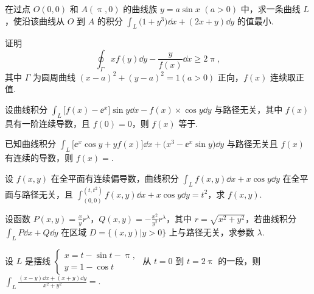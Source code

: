 	\begin{ti}
		在过点 $O(0,0)$ 和 $A(\uppi,0)$ 的曲线族 $y = a \sin x$ $(a > 0)$ 中，求一条曲线 $L$，使沿该曲线从 $O$ 到 $A$ 的积分 $\int_{L} \bigl( 1 + y^{3} \bigr) \dd{x} + (2x + y) \dd{y}$ 的值最小.
	\end{ti}

	\begin{ti}
		证明
		\[
			\oint_{\varGamma} x f(y) \dd{y} - \frac{y}{f(x)} \dd{x} \geq 2\uppi,
		\]
		其中 $\varGamma$ 为圆周曲线 $(x - a)^{2} + (y - a)^{2} = 1 (a > 0)$ 正向，$f(x)$ 连续取正值.
	\end{ti}

	\begin{ti}
		设曲线积分 $\int_{L} \bigl[ f(x) - \ee^{x} \bigr] \sin y \dd{x} - f(x)\times \cos y \dd{y}$ 与路径无关，其中 $f(x)$ 具有一阶连续导数，且 $f(0) = 0$，则 $f(x)$ 等于\kuo.

	\end{ti}

	\begin{ti}
		已知曲线积分 $\int_{L} \bigl[ \ee^{x} \cos y + y f(x) \bigr] \dd{x} + \bigl( x^{3} - \ee^{x} \sin y \bigr) \dd{y}$ 与路径无关且 $f(x)$ 有连续的导数，则 $f(x) = $\htwo.
	\end{ti}

	\begin{ti}
		设 $f(x,y)$ 在全平面有连续偏导数，曲线积分 $\int_{L} f(x,y) \dd{x} + x \cos y \dd{y}$ 在全平面与路径无关，且 $\int_{(0,0)}^{\left(t,t^{2}\right)} f(x,y) \dd{x} + x \cos y \dd{y} = t^{2}$，求 $f(x,y)$.
	\end{ti}

	\begin{ti}
		设函数 $P(x,y) = \frac{x}{y}r^{\lambda}$，$Q(x,y) = - \frac{x^{2}}{y^{2}}r^{\lambda}$，其中 $r = \sqrt{x^{2} + y^{2}}$，若曲线积分 $\int_{L} P \dd{x} + Q \dd{y}$ 在区域 $D = \bigl\{ (x,y) \bigl| y > 0 \bigr\}$ 上与路径无关，求参数 $\lambda$.
	\end{ti}

	\begin{ti}
		设 $L$ 是摆线 $\begin{cases}
			x = t - \sin t - \uppi,\\
			y = 1 - \cos t
		\end{cases}$ 从 $t = 0$ 到 $t = 2\uppi$ 的一段，则 $\int_{L} \frac{(x - y)\dd{x} + (x + y) \dd{y}}{x^{2} + y^{2}} = $\kuo.
		
		\fourch{$-\uppi$}{$\uppi$}{$2\uppi$}{$-2\uppi$}
	\end{ti}

